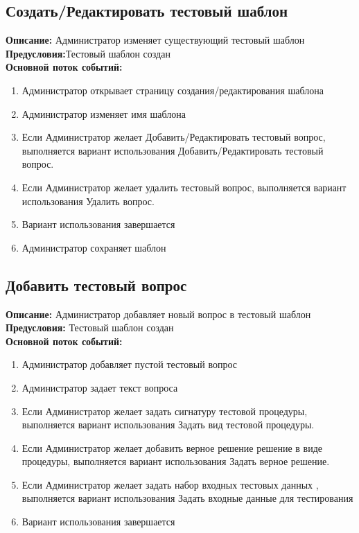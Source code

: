 \documentclass{article}
\begin{document}
    \subsection{Создать/Редактировать тестовый шаблон}
    \textbf{Описание:} Администратор изменяет существующий тестовый шаблон\\
    \textbf{Предусловия:}Тестовый шаблон создан\\
    \textbf{Основной поток событий:}
    \begin{enumerate}
        \item Администратор открывает страницу создания/редактирования шаблона
        \item Администратор изменяет имя шаблона
        \item Если Администратор желает Добавить/Редактировать тестовый вопрос, выполняется вариант использования Добавить/Редактировать тестовый вопрос.
        \item Если Администратор желает удалить тестовый вопрос, выполняется вариант использования Удалить вопрос.
        \item Вариант использования завершается
        \item Администратор сохраняет шаблон
    \end{enumerate} 
    
    \subsection{Добавить тестовый вопрос}
    \textbf{Описание:} Администратор добавляет новый вопрос в тестовый шаблон\\
    \textbf{Предусловия:} Тестовый шаблон создан\\
    \textbf{Основной поток событий:}
    \begin{enumerate}
        \item Администратор добавляет пустой тестовый вопрос
        \item Администратор задает текст вопроса
        \item Если Администратор желает задать сигнатуру тестовой процедуры, выполняется вариант использования Задать вид тестовой процедуры.
        \item Если Администратор желает добавить верное решение решение в виде процедуры, выполняется вариант использования Задать верное решение.
        \item Если Администратор желает задать набор входных тестовых данных , выполняется вариант использования Задать входные данные для тестирования
        \item Вариант использования завершается
    \end{enumerate}
\end{document}
